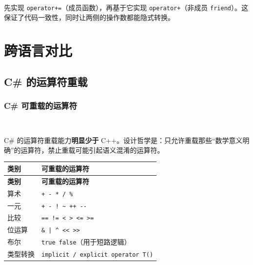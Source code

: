 \documentclass[12pt,a4paper,fontset=fandol]{ctexbook}
\newcommand{\cpp}[1]{C++#1}
\newcommand{\csharp}{C\#}
\newcommand{\Op}[1]{\texttt{operator#1}}
\newcommand{\csharplabel}{%
  \noindent\begin{tcolorbox}[sharp corners,colback=csharpheadbg,colframe=csharpheadbg,
    left=6pt,right=6pt,top=2pt,bottom=2pt,boxrule=0pt]
  \textcolor{white}{\small\bfseries\sffamily C\#}\end{tcolorbox}%
}
\begin{document}
\begin{guideline}[title=复合赋值与二元运算符的标准模式]
先实现 \Op{+=}（成员函数），再基于它实现 \Op{+}（非成员 \texttt{friend}）。这保证了代码一致性，同时让两侧的操作数都能隐式转换。
\end{guideline}

\part{跨语言对比}

\chapter{C\# 的运算符重载}

\section{C\# 可重载的运算符}

\csharplabel

\csharp{} 的运算符重载能力\textbf{明显少于} \cpp{}。设计哲学是：只允许重载那些``数学意义明确''的运算符，禁止重载可能引起语义混淆的运算符。

\begin{longtable}{ll}
\toprule
\textbf{类别} & \textbf{可重载的运算符} \\
\midrule
\endfirsthead
\toprule
\textbf{类别} & \textbf{可重载的运算符} \\
\midrule
\endhead
\bottomrule
\endfoot

算术 & \texttt{+ - * / \%} \\
一元 & \texttt{+ - ! \textasciitilde{} ++ -{}-} \\
比较 & \texttt{== != < > <= >=} \\
位运算 & \texttt{\& | \^{} << >>} \\
布尔 & \texttt{true false}（用于短路逻辑） \\
类型转换 & \texttt{implicit / explicit operator T()} \\
\end{longtable}
\end{document}
